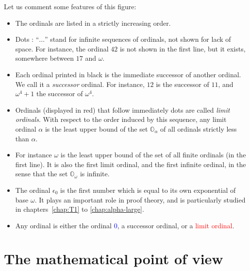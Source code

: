 Let us comment some features of this figure:

\begin{itemize}
\item The ordinals are listed in a strictly increasing order. 
\item Dots : ``$\ldots$'' stand for  infinite sequences of ordinals, not shown for lack of space. For instance, the ordinal $42$ is not shown in the first line, but it exists, somewhere between $17$ and $\omega$.
\item Each ordinal printed in black is the immediate successor of another ordinal. We call it a \emph{successor} ordinal. For instance, $12$ is the successor of $11$, and $\omega^4+1$ the successor of $\omega^4$.
\item Ordinals (displayed in red)  that  follow immediately dots are called \emph{limit ordinals}. With respect to the order induced by this sequence, any limit ordinal $\alpha$ is the least upper bound of  the set $\mathbb{O}_\alpha$ of all ordinals strictly less than $\alpha$.
\item
For instance $\omega$ is the least upper bound of the set of all finite ordinals (in the first line). It is also the first limit ordinal, and the first infinite ordinal, in the sense that 
the set $\mathbb{O}_\omega$ is infinite.
\item The ordinal $\epsilon_0$ is the first number which is equal to its own exponential of base $\omega$. It plays an important role in proof theory, and is particularly studied in chapters~\ref{chap:T1} to \ref{chap:alpha-large}.
\item Any ordinal is  either the ordinal \textcolor{blue}{$0$},
a successor ordinal, or a \textcolor{red}{limit ordinal}.
\end{itemize}




\section{The mathematical point of view}

